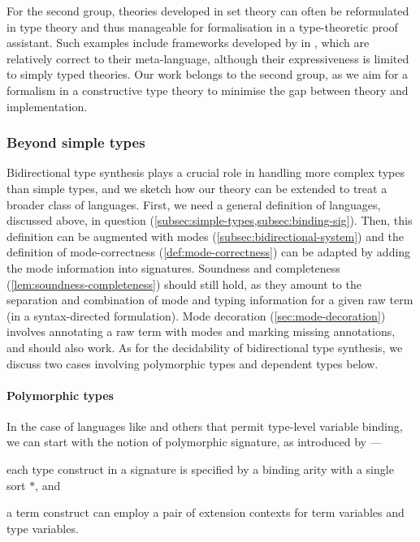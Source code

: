 For the second group, theories developed in set theory can often be reformulated in type theory and thus manageable for formalisation in a type-theoretic proof assistant. 
Such examples include frameworks developed by \citet{Allais2021,Fiore2022} in \Agda, which are relatively correct to their meta-language, although their expressiveness is limited to simply typed theories.
Our work belongs to the second group, as we aim for a formalism in a constructive type theory to minimise the gap between theory and implementation.

\subsubsection{Beyond simple types}

Bidirectional type synthesis plays a crucial role in handling more complex types than simple types, and we sketch how our theory can be extended to treat a broader class of languages.
First, we need a general definition of languages, discussed above, in question (\cref{subsec:simple-types,subsec:binding-sig}).
Then, this definition can be augmented with modes (\cref{subsec:bidirectional-system}) and the definition of mode-correctness (\cref{def:mode-correctness}) can be adapted by adding the mode information into signatures.
Soundness and completeness (\cref{lem:soundness-completeness}) should still hold, as they amount to the separation and combination of mode and typing information for a given raw term (in a syntax-directed formulation).
Mode decoration (\cref{sec:mode-decoration}) involves annotating a raw term with modes and marking missing annotations, and should also work.
As for the decidability of bidirectional type synthesis, we discuss two cases involving polymorphic types and dependent types below.

\paragraph{Polymorphic types}
In the case of languages like \SystemF and others that permit type-level variable binding, we can start with the notion of polymorphic signature, as introduced by \citet{Hamana2011}---\begin{inlineenum}
  \item each type construct in a signature is specified by a binding arity with a single sort $*$, and
  \item a term construct can employ a pair of extension contexts for term variables and type variables.
\end{inlineenum}

